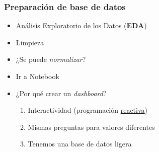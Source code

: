 \begin{frame}
    \frametitle{Preparación de base de datos}
    \begin{itemize}
        \item<1-> Análisis Exploratorio de los Datos (\textbf{EDA})
        \item<2-> Limpieza
        \item<3-> ¿Se puede \textit{normalizar}?
        \item<4-> Ir a Notebook 
        \item<5-> ¿Por qué crear un \textit{dashboard}?
        \begin{enumerate}
            \item<6-> Interactividad (programación \underline{reactiva})
            \item<7-> Mismas preguntas para valores diferentes
            \item<8-> Tenemos una base de datos ligera
        \end{enumerate}
  \end{itemize}
\end{frame}